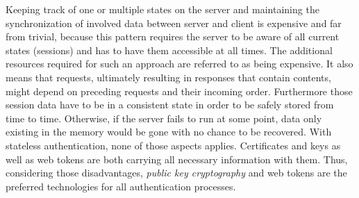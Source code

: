 \documentclass[12pt,english,a4paper,titlepage,cleardoublepage=empty,dottedtoc]{report}
\begin{document}
Keeping track of one or multiple states on the server and maintaining
the synchronization of involved data between server and client is
expensive and far from trivial, because this pattern requires the server
to be aware of all current states (sessions) and has to have them
accessible at all times. The additional resources required for such an
approach are referred to as being expensive. It also means that
requests, ultimately resulting in responses that contain contents, might
depend on preceding requests and their incoming order. Furthermore those
session data have to be in a consistent state in order to be safely
stored from time to time. Otherwise, if the server fails to run at some
point, data only existing in the memory would be gone with no chance to
be recovered. With stateless authentication, none of those aspects
applies. Certificates and keys as well as web tokens are both carrying
all necessary information with them. Thus, considering those
disadvantages, \emph{public key cryptography} and web tokens are the
preferred technologies for all authentication processes.
\end{document}

